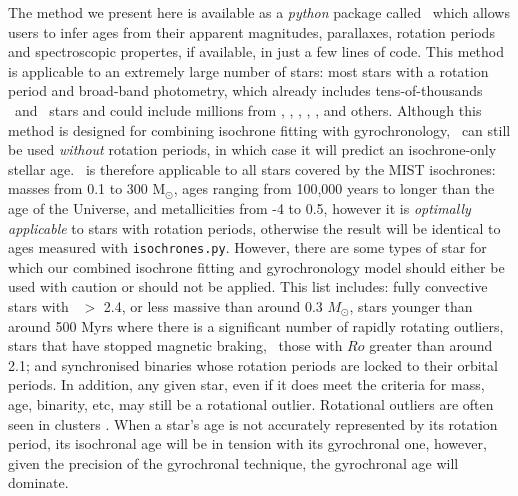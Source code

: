 The method we present here is available as a {\it python} package called \sd\
which allows users to infer ages from their apparent magnitudes, parallaxes,
rotation periods and spectroscopic propertes, if available, in just a few
lines of code.
This method is applicable to an extremely large number of stars: most stars
with a rotation period and broad-band photometry, which already includes
tens-of-thousands \kepler\ and \ktwo\ stars and could include millions from
\tess, \lsst, \wfirst, \plato, \gaia, and others.
Although this method is designed for combining isochrone fitting with
gyrochronology, \sd\ can still be used {\it without} rotation periods, in
which case it will predict an isochrone-only stellar age.
\sd\ is therefore applicable to all stars covered by the MIST isochrones:
masses from 0.1 to 300 M$_\odot$, ages ranging from 100,000 years to longer
than the age of the Universe, and metallicities from -4 to 0.5, however it is
{\it optimally applicable} to stars with rotation periods, otherwise the
result will be identical to ages measured with {\tt isochrones.py}.
However, there are some types of star for which our combined isochrone fitting
and gyrochronology model should either be used with caution or should not be
applied.
This list includes: fully convective stars with \gcolor\ $>$ 2.4, or less
massive than around 0.3 $M_\odot$, stars younger than around 500 Myrs where
there is a significant number of rapidly rotating outliers, stars that have
stopped magnetic braking, \ie\ those with $Ro$ greater than around 2.1; and
synchronised binaries whose rotation periods are locked to their orbital
periods.
In addition, any given star, even if it does meet the criteria for mass,
age, binarity, etc, may still be a rotational outlier.
Rotational outliers are often seen in clusters \citep[see \eg][]{douglas2016,
rebull2016, douglas2017, rebull2017}.
When a star's age is not accurately represented by its rotation period, its
isochronal age will be in tension with its gyrochronal one, however, given the
precision of the gyrochronal technique, the gyrochronal age will dominate.
